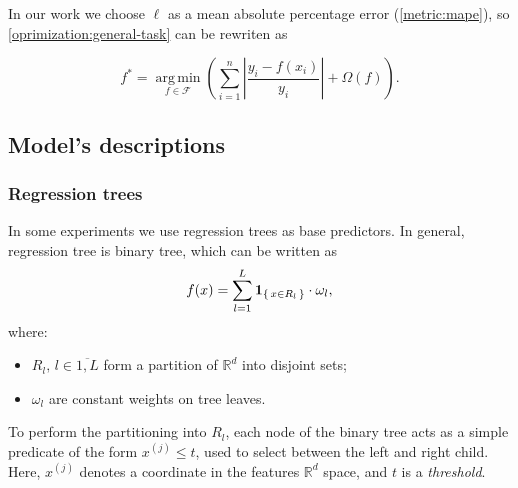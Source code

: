 \documentclass{article}
\DeclareMathOperator*{\argmin}{arg\,min}
\newcommand{\Indicator}[1]{\mathbf{1}_{\set{#1}}}
\newcommand{\Reals}{\mathbb{R}}
\newcommand{\Models}{\mathcal{F}}
\newcommand{\BestModel}{f^*}
\begin{document}
In our work we choose \(\ell\) as a mean absolute percentage error (\ref{metric:mape}), so \ref{oprimization:general-task} can be rewriten as

\begin{equation}
    \BestModel
    =
    \argmin\limits_{
        f \in \Models
    }{
        \left(
        \sum_{i=1}^{n} \left| \frac{y_i - f({x_i})}{y_i} \right|
        +
        \Omega(f)
        \right)
    }.
    \label{oprimization:task}
    \tag{Opt.~task}
\end{equation}



\subsection{Model's descriptions}

\subsubsection{Regression trees}
\label{model:regression-tree}

In some experiments we use regression trees as base predictors. In general, regression tree is binary tree, which can be written as
\begin{equation}
    f(x)
    =
    \sum\limits_{l=1}^{L}\Indicator{x \in R_l}\cdot\omega_l,
\end{equation}
where:
\begin{itemize}
    \item \(R_l,\, l \in \overline{1, L}\) form a partition of \(\Reals^d\) into disjoint sets;
    \item \(\omega_l\) are constant weights on tree leaves.
\end{itemize}

To perform the partitioning into \( R_l \), each node of the binary tree acts as a simple predicate of the form \( x^{(j)} \le t \), used to select between the left and right child. Here, \( x^{(j)} \) denotes a coordinate in the features \( \Reals^d \) space, and \( t \) is a \emph{threshold}.

\end{document}
